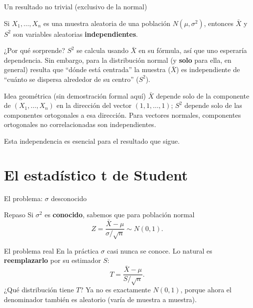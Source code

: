 \documentclass[aspectratio=169,11pt]{beamer}
\begin{document}
\begin{frame}{Un resultado no trivial (exclusivo de la normal)}
\begin{theorem}
Si $X_1,\dots,X_n$ es una muestra aleatoria de una población $N(\mu,\sigma^2)$, entonces $\bar X$ y $S^2$ son variables aleatorias \textbf{independientes}.
\end{theorem}

\begin{block}{¿Por qué sorprende?}
$S^2$ se calcula usando $\bar X$ en su fórmula, así que uno esperaría dependencia. Sin embargo, para la distribución normal (y \textbf{solo} para ella, en general) resulta que ``dónde está centrada'' la muestra ($\bar X$) es independiente de ``cuánto se dispersa alrededor de su centro'' ($S^2$).
\end{block}

\begin{alertblock}{Idea geométrica (sin demostración formal aquí)}
$\bar X$ depende solo de la componente de $(X_1,\dots,X_n)$ en la dirección del vector $(1,1,\dots,1)$; $S^2$ depende solo de las componentes ortogonales a esa dirección. Para vectores normales, componentes ortogonales no correlacionadas son independientes.
\end{alertblock}

Esta independencia es esencial para el resultado que sigue.
\end{frame}

\section{El estadístico t de Student}

\begin{frame}{El problema: $\sigma$ desconocido}
\begin{block}{Repaso}
Si $\sigma^2$ es \textbf{conocido}, sabemos que para población normal
$$Z = \frac{\bar X-\mu}{\sigma/\sqrt n} \sim N(0,1).$$
\end{block}

\begin{alertblock}{El problema real}
En la práctica $\sigma$ casi nunca se conoce. Lo natural es \textbf{reemplazarlo} por su estimador $S$:
$$T = \frac{\bar X - \mu}{S/\sqrt n}.$$
¿Qué distribución tiene $T$? Ya no es exactamente $N(0,1)$, porque ahora el denominador también es aleatorio (varía de muestra a muestra).
\end{alertblock}
\end{frame}
\end{document}
